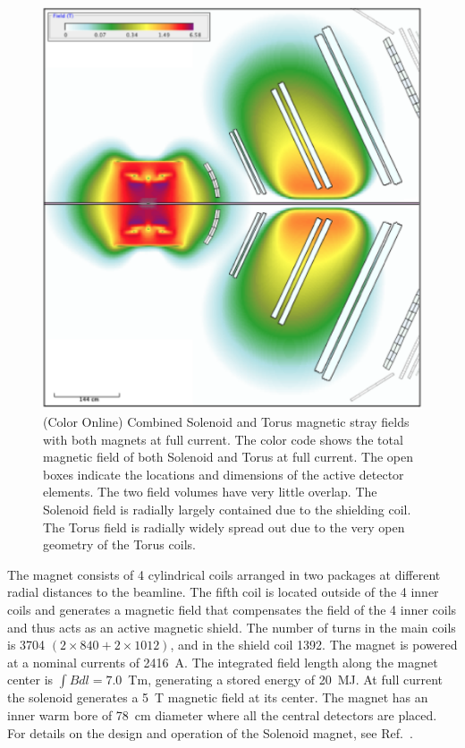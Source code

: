 \documentclass[final,3p,twocolumn]{elsarticle}
\begin{document}
\begin{figure}[htbp!]
\label{solenoid-torus}
\vspace{0.5cm}
\centerline{\includegraphics[width=0.8\columnwidth]{magfield-2.png}}
\caption{(Color Online) Combined Solenoid and Torus magnetic stray fields with both magnets at full current. The 
color code shows the total magnetic field of both Solenoid and Torus at full current. The open boxes indicate the 
locations and dimensions of the active detector elements. The two field volumes have very little overlap.
The Solenoid field is radially largely contained due to 
the shielding coil. The Torus field is radially widely spread out due to the very open geometry of the Torus coils.  }
\label{stray-field}
\end{figure}
The magnet consists of 4 cylindrical coils arranged in two packages at different radial distances to the beamline. The
fifth coil is located outside of the 4 inner coils and generates a magnetic field that compensates the field of the 4 inner
coils and thus acts as an active magnetic shield. The number of turns in the main coils is 3704
$(2 \times 840 + 2 \times 1012)$, and in the shield coil 1392. The magnet is powered at a nominal currents of 2416~A.
The integrated field length along the magnet center is $\int Bdl = 7.0$~Tm, generating a stored energy of 20~MJ. At
full current the solenoid generates a 5~T magnetic field at its center. The magnet has an inner warm bore of 78~cm
diameter where all the central detectors are placed.  For details on the design and operation of the Solenoid magnet,
see Ref.~\cite{clas12-magnets}.
\end{document}
